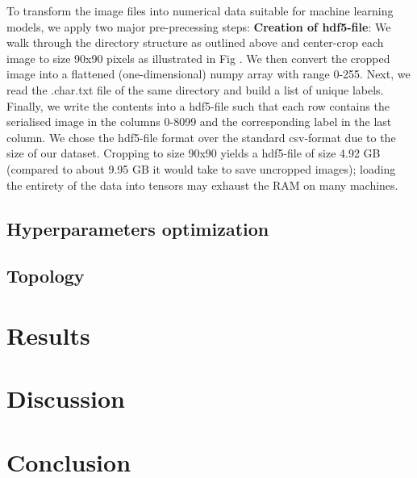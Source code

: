 \documentclass[british,12p]{article}
\begin{document}
    	To transform the image files into numerical data suitable for machine learning models, we apply two major pre-precessing steps:
    	\textbf{Creation of hdf5-file}: We walk through the directory structure as outlined above and center-crop each image to size 90x90 pixels as illustrated in Fig . We then convert the cropped image into a flattened (one-dimensional) numpy array with range 0-255. Next, we read the .char.txt file of the same directory and build a list of unique labels. Finally, we write the contents into a hdf5-file such that each row contains the serialised image in the columns 0-8099 and the corresponding label in the last column. We chose the hdf5-file format over the standard csv-format due to the size of our dataset. Cropping to size 90x90 yields a hdf5-file of size 4.92 GB (compared to about 9.95 GB it would take to save uncropped images); loading the entirety of the data into tensors may exhaust the RAM on many machines.
    	
    	
    	
    \subsection{Hyperparameters optimization}
    \subsection{Topology}

    \section{Results}
    \section{Discussion}
    \section{Conclusion}
           
            
      \printbibliography
    
\end{document}
